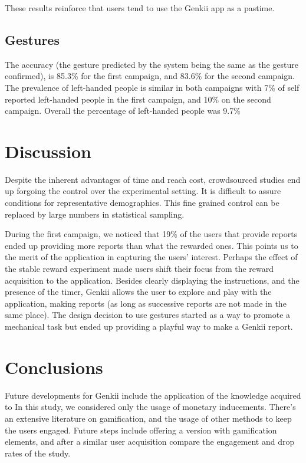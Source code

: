 \documentclass[letterpaper]{article}
\begin{document}
These results reinforce that users tend to use the Genkii app as a pastime. 

\subsection{Gestures} 
The accuracy (the gesture predicted by the system being the same as the gesture confirmed), is 85.3\% for the first campaign, and 83.6\% for the second campaign.
The prevalence of left-handed people is similar in both campaigns with 7\% of self reported left-handed people in the first campaign, and 10\% on the second campaign. Overall the percentage of left-handed people was 9.7\%

\section{Discussion}

Despite the inherent advantages of time and reach cost, crowdsourced studies end up forgoing the control over the experimental setting. It is difficult to assure conditions for representative demographics. 
This fine grained control can be replaced by large numbers in statistical sampling. 


During the first campaign, we noticed that 19\% of the users that provide reports ended up providing more reports than what the rewarded ones.
This points us to the merit of the application in capturing the users' interest. 
Perhaps the effect of the stable reward experiment made users shift their focus from the reward acquisition to the application. Besides clearly displaying the instructions, and the presence of the timer, Genkii allows the user to explore and play with the application, making reports (as long as successive reports are not made in the same place). 
The design decision to use gestures started as a way to promote a mechanical task but ended up providing a playful way to make a Genkii report.









 


\section{Conclusions}






Future developments for Genkii include the application of the knowledge acquired to 
In this study, we considered only the usage of monetary inducements. There's an extensive literature on gamification, and the usage of other methods to keep the users engaged. Future steps include offering a version with gamification elements, and after a similar user acquisition compare the engagement and drop rates of the study.
\end{document}
